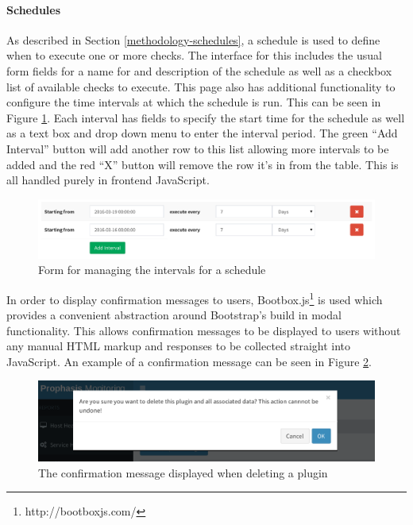 \documentclass[bsc,logo,twoside,parskip,singlespacing,notimes]{infthesis}
\begin{document}
\paragraph*{Schedules}
	As described in Section \ref{methodology-schedules}, a schedule is used to
	define when to execute one or more checks.  The interface for this includes the
	usual form fields for a name for and description of the schedule as well as a
	checkbox list of available checks to execute.  This page also has additional
	functionality to configure the time intervals at which the schedule is run. This
	can be seen in Figure \ref{schedule-intervals}.  Each interval has fields to
	specify the start time for the schedule as well as a text box and drop down menu
	to enter the interval period.  The green ``Add Interval'' button will add another
	row to this list allowing more intervals to be added and the red ``X'' button will
	remove the row it's in from the table.  This is all handled purely in frontend
	JavaScript.

\begin{figure}[H]
	\caption{Form for managing the intervals for a schedule}
	\label{schedule-intervals}
	\includegraphics[scale=0.54]{assets/screenshots/schedule-intervals.pdf}
\end{figure}


	In order to display confirmation messages to users,
	Bootbox.js\footnote{http://bootboxjs.com/} is used which provides a convenient
	abstraction around Bootstrap's build in modal functionality.  This allows
	confirmation messages to be displayed to users without any manual HTML markup
	and responses to be collected straight into JavaScript.  An example of a
	confirmation message can be seen in Figure \ref{bootbox-delete}.

\begin{figure}[H]
	\centering
	\caption{The confirmation message displayed when deleting a plugin}
	\label{bootbox-delete}
	\includegraphics[scale=0.6]{assets/screenshots/bootbox-delete.pdf}
\end{figure}
\end{document}
